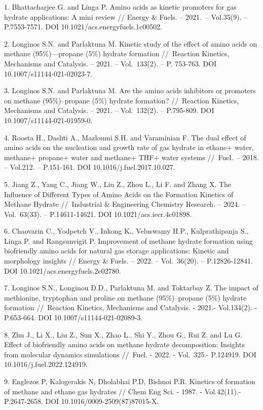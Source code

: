 \begin{refs}
1. Bhattacharjee G. and Linga P. Amino acids as kinetic promoters for
gas hydrate applications: A mini review // Energy \& Fuels. -- 2021.~--
Vol.35(9). -- P.7553-7571. DOI 10.1021/acs.energyfuels.1c00502.

2. Longinos S.N. and Parlaktuna M. Kinetic study of the effect of amino
acids on methane (95\%)---propane (5\%) hydrate formation //~Reaction
Kinetics, Mechanisms and Catalysis. -- 2021. -- Vol.~133(2). -- P.
753-763. DOI 10.1007/s11144-021-02023-7.

3. Longinos S.N. and Parlaktuna M. Are the amino acids inhibitors or
promoters on methane (95\%)--propane (5\%) hydrate formation?
//~Reaction Kinetics, Mechanisms and Catalysis. -- 2021. -- Vol.~132(2).
-- P.795-809. DOI 10.1007/s11144-021-01959-0.

4. Roosta H., Dashti A., Mazloumi S.H. and Varaminian F. The dual effect
of amino acids on the nucleation and growth rate of gas hydrate in
ethane+ water, methane+ propane+ water and methane+ THF+ water systems
//~Fuel.~-- 2018. -- Vol.212. -- P.151-161. DOI
10.1016/j.fuel.2017.10.027.

5. Jiang Z., Yang C., Jiang W., Liu Z., Zhou L., Li F. and Zhang X. The
Influence of Different Types of Amino Acids on the Formation Kinetics of
Methane Hydrate //~Industrial \& Engineering Chemistry Research. --
2024. -- Vol.~63(33). -- P.14611-14621. DOI 10.1021/acs.iecr.4c01898.

6. Chaovarin C., Yodpetch V., Inkong K., Veluswamy H.P., Kulprathipanja
S., Linga P. and Rangsunvigit P. Improvement of methane hydrate
formation using biofriendly amino acids for natural gas storage
applications: Kinetic and morphology insights // Energy \& Fuels. --
2022. -- Vol.~36(20). -- P.12826-12841. DOI
10.1021/acs.energyfuels.2c02780.

7. Longinos S.N., Longinou D.D., Parlaktuna M. and Toktarbay Z. The
impact of methionine, tryptophan and proline on methane (95\%)--propane
(5\%) hydrate formation //~Reaction Kinetics, Mechanisms and Catalysis.
- 2021.- Vol.134(2). - P.653-664. DOI 10.1007/s11144-021-02089-3.

8. Zhu J., Li X., Liu Z., Sun X., Zhao L., Shi Y., Zhou G., Rui Z. and
Lu G. Effect of biofriendly amino acids on methane hydrate
decomposition: Insights from molecular dynamics simulations //~Fuel. -
2022. - Vol.~325.- P.124919. DOI 10.1016/j.fuel.2022.124919.

9. Englezos P, Kalogerakis N, Dholabhai P.D, Bishnoi P.R. Kinetics of
formation of methane and ethane gas hydrates // Chem Eng Sci. - 1987. -
Vol.42(11).- P.2647-2658. DOI 10.1016/0009-2509(87)87015-X.


\end{refs}
